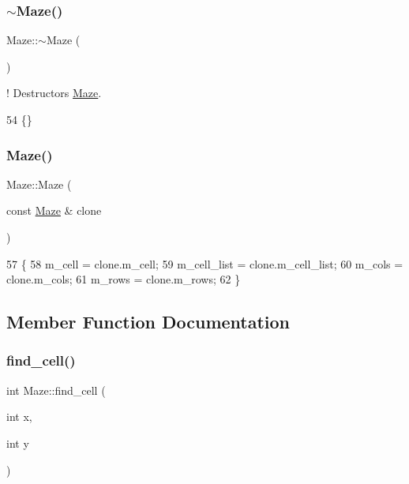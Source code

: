 \subsubsection{\texorpdfstring{$\sim$\+Maze()}{~Maze()}}
{\footnotesize\ttfamily Maze\+::$\sim$\+Maze (\begin{DoxyParamCaption}{ }\end{DoxyParamCaption})\hspace{0.3cm}{\ttfamily [inline]}}



! Destructors \hyperlink{classMaze}{Maze}. 


\begin{DoxyCode}
54 \{\}
\end{DoxyCode}
\mbox{\label{classMaze_ace1fa70e147e319c7ff135f1ca1bd0e3}} 
\subsubsection{\texorpdfstring{Maze()}{Maze()}\hspace{0.1cm}{\footnotesize\ttfamily [2/2]}}
{\footnotesize\ttfamily Maze\+::\+Maze (\begin{DoxyParamCaption}\item[{const \hyperlink{classMaze}{Maze} \&}]{clone }\end{DoxyParamCaption})\hspace{0.3cm}{\ttfamily [inline]}}


\begin{DoxyCode}
57         \{
58             m\_cell = clone.m\_cell;
59             m\_cell\_list = clone.m\_cell\_list;
60             m\_cols = clone.m\_cols;
61             m\_rows = clone.m\_rows;
62         \}
\end{DoxyCode}


\subsection{Member Function Documentation}
\mbox{\label{classMaze_aa59b935dcd5f7129636cea6e40882c56}} 
\subsubsection{\texorpdfstring{find\+\_\+cell()}{find\_cell()}}
{\footnotesize\ttfamily int Maze\+::find\+\_\+cell (\begin{DoxyParamCaption}\item[{int}]{x,  }\item[{int}]{y }\end{DoxyParamCaption})\hspace{0.3cm}{\ttfamily [inline]}}



